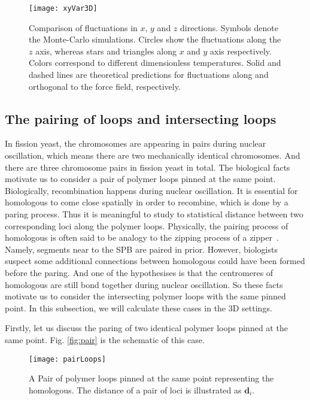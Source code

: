 \begin{figure}[htpb]
    \centering
    \texttt{[image: xyVar3D]}
    \caption{Comparison of fluctuations in $x$, $y$ and $z$ directions. Symbols denote the Monte-Carlo simulations. Circles show the fluctuations along the $z$ axis, whereas stars and triangles along $x$ and $y$ axis respectively. Colors correspond to different dimensionless temperatures. Solid and dashed lines are theoretical predictions for fluctuations along and orthogonal to the force field, respectively.}
    \label{fig:xyVar3D}
\end{figure}


\subsection{The pairing of loops and intersecting loops}
\label{sub:the_pairing_of_loops_and_intersecting_loops}

In fission yeast, the chromosomes are appearing in pairs during nuclear oscillation, which means there are two mechanically identical chromosomes. And there are three chromosome pairs in fission yeast in total. The biological facts motivate us to consider a pair of polymer loops pinned at the same point. 
Biologically, recombination happens during nuclear oscillation. It is essential for homologous to come close spatially in order to recombine, which is done by a paring process. Thus it is meaningful to study to statistical distance between two corresponding loci along the polymer loops.
Physically, the pairing process of homologous is often said to be analogy to the zipping process of a zipper~\cite{Tsai2011}. Namely, segments near to the SPB are paired in prior. However, biologists suspect some additional connections between homologous could have been formed before the paring. And one of the hypothesises is that the centromeres of homologous are still bond together during nuclear oscillation. So these facts motivate us to consider the intersecting polymer loops with the same pinned point. In this subsection, we will calculate these cases in the 3D settings.

Firstly, let us discuss the paring of two identical polymer loops pinned at the same point. Fig. \ref{fig:pair} is the schematic of this case.
\begin{figure}[htpb]
    \centering
    \texttt{[image: pairLoops]}
    \caption{A Pair of polymer loops pinned at the same point representing the homologous. The distance of a pair of loci is illustrated as $\mathbf{d}_i$. }
    \label{fig:pairLoops}
\end{figure}

